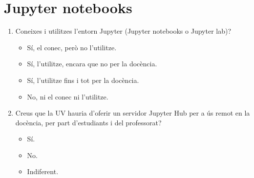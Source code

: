 \documentclass[a4paper,12pt]{article}
\newcounter{preg}[section]
\begin{document}
\section{Jupyter notebooks}
\begin{enumerate}
\item {} Coneixes i utilitzes l'entorn Jupyter (Jupyter notebooks o Jupyter lab)? \cite{Barba2019}
   \begin{itemize}
   \item Sí, el conec, però no l'utilitze.
   \item Sí, l'utilitze, encara que no per la docència.
   \item Sí, l'utilitze fins i tot per la docència.
   \item No, ni el conec ni l'utilitze.
   \end{itemize}

\item Creus que la UV hauria d'oferir un servidor Jupyter Hub per a ús remot en la docència,
      per part d'estudiants i del professorat? \cite{JupyterHub}
   \begin{itemize}
   \item Sí.
   \item No.
   \item Indiferent.
   \end{itemize}
\end{enumerate}
\end{document}
